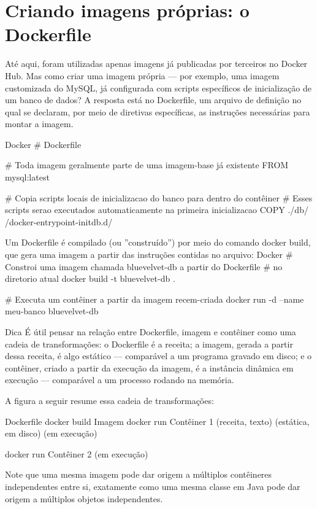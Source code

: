 \section{Criando imagens próprias: o Dockerfile}

Até aqui, foram utilizadas apenas imagens já publicadas por terceiros no Docker Hub. Mas como criar uma imagem própria — por exemplo, uma imagem customizada do MySQL, já configurada com scripts específicos de inicialização de um banco de dados? A resposta está no Dockerfile, um arquivo de definição no qual se declaram, por meio de diretivas específicas, as instruções necessárias para montar a imagem.

Docker \# Dockerfile

\# Toda imagem geralmente parte de uma imagem-base já existente FROM mysql:latest

\# Copia scripts locais de inicializacao do banco para dentro do contêiner \# Esses scripts serao executados automaticamente na primeira inicializacao COPY ./db/ /docker-entrypoint-initdb.d/

Um Dockerfile é compilado (ou ”construído”) por meio do comando docker build, que gera uma imagem a partir das instruções contidas no arquivo: Docker \# Constroi uma imagem chamada bluevelvet-db a partir do Dockerfile \# no diretorio atual docker build -t bluevelvet-db .

\# Executa um contêiner a partir da imagem recem-criada docker run -d --name meu-banco bluevelvet-db

\begin{infobox}{Dica}
É útil pensar na relação entre Dockerfile, imagem e contêiner como uma cadeia de transformações: o Dockerfile é a receita; a imagem, gerada a partir dessa receita, é algo estático — comparável a um programa gravado em disco; e o contêiner, criado a partir da execução da imagem, é a instância dinâmica em execução — comparável a um processo rodando na memória.
\end{infobox}

A figura a seguir resume essa cadeia de transformações:

Dockerfile docker build Imagem docker run Contêiner 1 (receita, texto) (estática, em disco) (em execução)

\begin{infobox}{docker run}
Contêiner 2 (em execução)
\end{infobox}

Note que uma mesma imagem pode dar origem a múltiplos contêineres independentes entre si, exatamente como uma mesma classe em Java pode dar origem a múltiplos objetos independentes.

